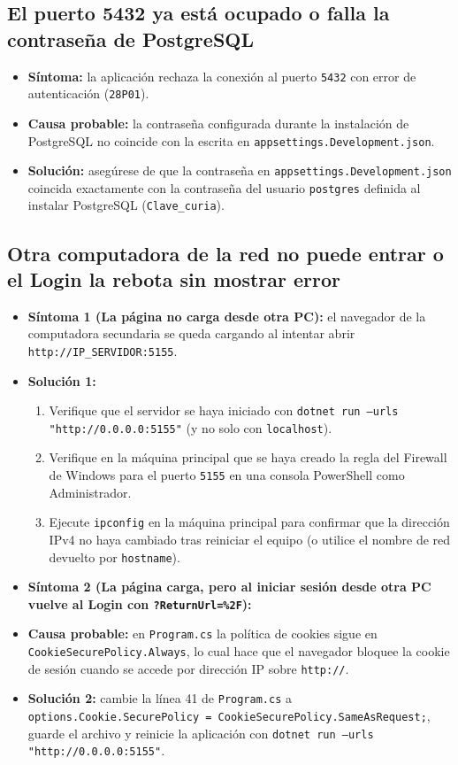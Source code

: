 \subsection{El puerto 5432 ya está ocupado o falla la contraseña de PostgreSQL}
\begin{itemize}
    \item \textbf{Síntoma:} la aplicación rechaza la conexión al puerto \texttt{5432} con error de autenticación (\texttt{28P01}).
    \item \textbf{Causa probable:} la contraseña configurada durante la instalación de PostgreSQL no coincide con la escrita en \texttt{appsettings.Development.json}.
    \item \textbf{Solución:} asegúrese de que la contraseña en \texttt{appsettings.Development.json} coincida exactamente con la contraseña del usuario \texttt{postgres} definida al instalar PostgreSQL (\texttt{Clave\_curia}).
\end{itemize}

\subsection{Otra computadora de la red no puede entrar o el Login la rebota sin mostrar error}
\begin{itemize}
    \item \textbf{Síntoma 1 (La página no carga desde otra PC):} el navegador de la computadora secundaria se queda cargando al intentar abrir \texttt{http://IP\_SERVIDOR:5155}.
    \item \textbf{Solución 1:}
    \begin{enumerate}
        \item Verifique que el servidor se haya iniciado con \texttt{dotnet run --urls "http://0.0.0.0:5155"} (y no solo con \texttt{localhost}).
        \item Verifique en la máquina principal que se haya creado la regla del Firewall de Windows para el puerto \texttt{5155} en una consola PowerShell como Administrador.
        \item Ejecute \texttt{ipconfig} en la máquina principal para confirmar que la dirección IPv4 no haya cambiado tras reiniciar el equipo (o utilice el nombre de red devuelto por \texttt{hostname}).
    \end{enumerate}
    \item \textbf{Síntoma 2 (La página carga, pero al iniciar sesión desde otra PC vuelve al Login con \texttt{?ReturnUrl=\%2F}):}
    \item \textbf{Causa probable:} en \texttt{Program.cs} la política de cookies sigue en \texttt{CookieSecurePolicy.Always}, lo cual hace que el navegador bloquee la cookie de sesión cuando se accede por dirección IP sobre \texttt{http://}.
    \item \textbf{Solución 2:} cambie la línea 41 de \texttt{Program.cs} a \texttt{options.Cookie.SecurePolicy = CookieSecurePolicy.SameAsRequest;}, guarde el archivo y reinicie la aplicación con \texttt{dotnet run --urls "http://0.0.0.0:5155"}.
\end{itemize}

